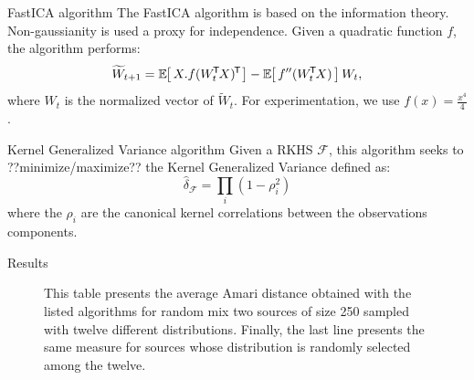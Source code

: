 \documentclass{beamer}
\begin{document}
\begin{frame}{}
\begin{columns}[T]
\begin{column}{.48\linewidth}

\begin{block}{FastICA algorithm}
The FastICA algorithm is based on the information theory. Non-gaussianity is used a proxy for independence. Given a quadratic function $f$, the algorithm performs:
\begin{equation}
  \widetilde W_{t+1} = \zesp{X.\ztr{f(\ztr{W_t}X)}} - \zesp{f''(\ztr{W_t}X)}W_t,
\end{equation}
where $W_t$ is the normalized vector of $\widetilde W_t$. For experimentation, we use $f(x) = \frac{x^4}4$.
\end{block}


\begin{block}{Kernel Generalized Variance algorithm}
Given a RKHS $\mathcal{F}$, this algorithm seeks to ??minimize/maximize?? the Kernel Generalized Variance defined as:
\begin{equation}
\widehat{\delta}_{\mathcal{F}}=\underset{i}{\prod}(1-\rho_i^2)
\end{equation}
where the $\rho_i$ are the canonical kernel correlations between the observations components.
\end{block}


%
%


\begin{block}{Results}

\begin{figure}
\label{distres}
\centering

\caption{This table presents the average Amari distance obtained with the listed algorithms for random mix two sources of size 250 sampled with twelve different distributions. Finally, the last line presents the same measure for sources whose distribution is randomly selected among the twelve.}
\end{figure}


\end{block}
\end{column}
\end{columns}
\end{frame}
\end{document}
